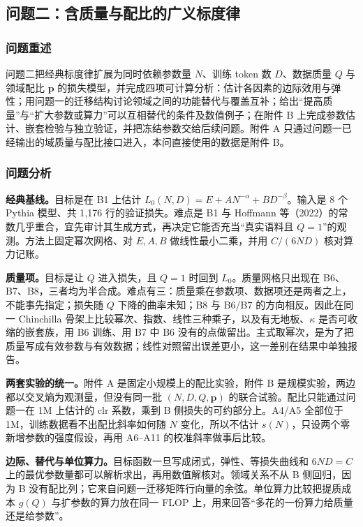 \subsection{问题二：含质量与配比的广义标度律}

\subsubsection{问题重述}

问题二把经典标度律扩展为同时依赖参数量 $N$、训练 token 数 $D$、数据质量 $Q$ 与领域配比 $\mathbf{p}$ 的损失模型，并完成四项可计算分析：估计各因素的边际效用与弹性；用问题一的迁移结构讨论领域之间的功能替代与覆盖互补；给出“提高质量”与“扩大参数或算力”可以互相替代的条件及数值例子；在附件 B 上完成参数估计、嵌套检验与独立验证，并把冻结参数交给后续问题。附件 A 只通过问题一已经输出的域质量与配比接口进入，本问直接使用的数据是附件 B。

\subsubsection{问题分析}

\textbf{经典基线。}目标是在 B1 上估计 $L_0(N,D)=E+AN^{-\alpha}+BD^{-\beta}$。输入是 8 个 Pythia 模型、共 1{,}176 行的验证损失。难点是 B1 与 Hoffmann 等（2022）的常数几乎重合，宜先审计其生成方式，再决定它能否充当“真实语料且 $Q=1$”的观测。方法上固定幂次网格、对 $E,A,B$ 做线性最小二乘，并用 $C/(6ND)$ 核对算力记账。

\textbf{质量项。}目标是让 $Q$ 进入损失，且 $Q=1$ 时回到 $L_0$。质量网格只出现在 B6、B7、B8，三者均为半合成。难点有三：质量乘在参数项、数据项还是两者之上，不能事先指定；损失随 $Q$ 下降的曲率未知；B8 与 B6/B7 的方向相反。因此在同一 Chinchilla 骨架上比较幂次、指数、线性三种乘子，以及有无地板、$\kappa$ 是否可收缩的嵌套族，用 B6 训练、用 B7 中 B6 没有的点做留出。主式取幂次，是为了把质量写成有效参数与有效数据；线性对照留出误差更小，这一差别在结果中单独报告。

\textbf{两套实验的统一。}附件 A 是固定小规模上的配比实验，附件 B 是规模实验，两边都以交叉熵为观测量，但没有同一批 $(N,D,Q,\mathbf{p})$ 的联合试验。配比只能通过问题一在 1M 上估计的 clr 系数，乘到 B 侧损失的可约部分上。A4/A5 全部位于 1M，训练数据看不出配比斜率如何随 $N$ 变化，所以不估计 $s(N)$，只设两个零新增参数的强度假设，再用 A6--A11 的校准斜率做事后比较。

\textbf{边际、替代与单位算力。}目标函数一旦写成闭式，弹性、等损失曲线和 $6ND=C$ 上的最优参数量都可以解析求出，再用数值解核对。领域关系不从 B 侧回归，因为 B 没有配比列；它来自问题一迁移矩阵行向量的余弦。单位算力比较把提质成本 $g(Q)$ 与扩参数的算力放在同一 FLOP 上，用来回答“多花的一份算力给质量还是给参数”。

